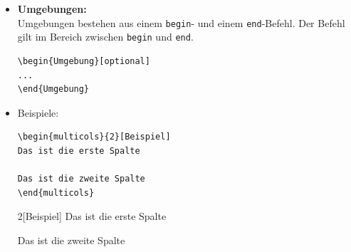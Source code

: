 \begin{frame}[fragile]


\begin{itemize}
	\item \textbf{Umgebungen:}\\
	Umgebungen bestehen aus einem \texttt{begin}- und einem \texttt{end}-Befehl. Der Befehl gilt im Bereich zwischen \texttt{begin} und \texttt{end}.

\begin{lstlisting}
\begin{Umgebung}[optional]
...
\end{Umgebung}
\end{lstlisting}

	\pause 
	
	\item Beispiele:
	
\begin{lstlisting}
\begin{multicols}{2}[Beispiel]
Das ist die erste Spalte

Das ist die zweite Spalte
\end{multicols}
\end{lstlisting}
	
	\pause 
			
\ea 
\begin{multicols}{2}[Beispiel]
	Das ist die erste Spalte
		
	Das ist die zweite Spalte
\end{multicols}

\z 

\end{itemize}

\end{frame}


